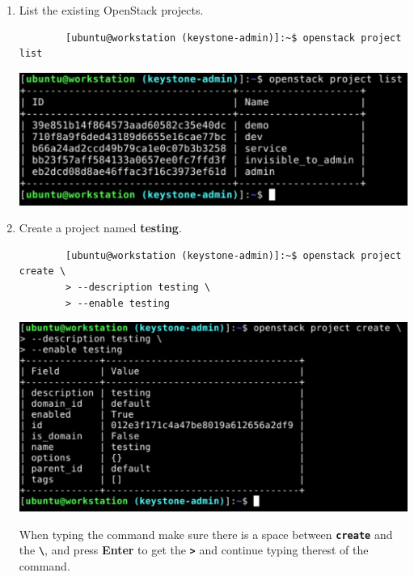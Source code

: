 \documentclass[letterpaper, 12pt]{article}
\begin{document}
\begin{enumerate}
    \item List the existing OpenStack projects.
    \begin{lstlisting}
        [ubuntu@workstation (keystone-admin)]:~$ openstack project list
    \end{lstlisting}

    \begin{center}
        \includegraphics[width=\linewidth]{images/part2/step3.png}
    \end{center}

    \item Create a project named \textbf{testing}.
    \begin{lstlisting}
        [ubuntu@workstation (keystone-admin)]:~$ openstack project create \
        > --description testing \
        > --enable testing
    \end{lstlisting}

    \begin{center}
        \includegraphics[width=\linewidth]{images/part2/step4.png}
    \end{center}

    \begin{tipbox}
        When typing the command make sure there is a space between \textbf{\texttt{create}} and the
        \textbf{\texttt{\textbackslash}}, and press \textbf{Enter} to get the \textbf{\texttt{>}} and continue typing
        therest of the command.
    \end{tipbox}


\end{enumerate}
\end{document}
